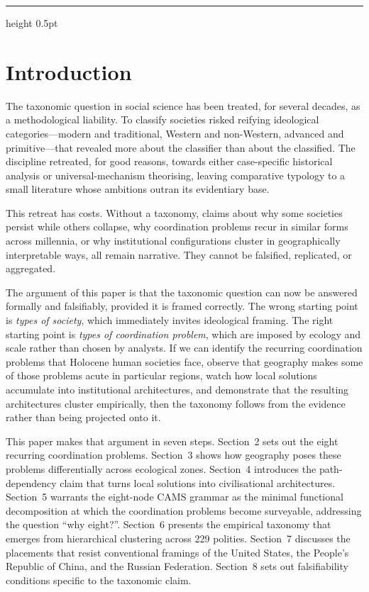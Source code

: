 \documentclass[12pt,a4paper]{article}
\begin{document}
\vspace{1em}
\hrule height 0.5pt
\vspace{0.5em}

\section{Introduction}

The taxonomic question in social science has been treated, for several decades, as a methodological liability. To classify societies risked reifying ideological categories---modern and traditional, Western and non-Western, advanced and primitive---that revealed more about the classifier than about the classified. The discipline retreated, for good reasons, towards either case-specific historical analysis or universal-mechanism theorising, leaving comparative typology to a small literature whose ambitions outran its evidentiary base.

This retreat has costs. Without a taxonomy, claims about why some societies persist while others collapse, why coordination problems recur in similar forms across millennia, or why institutional configurations cluster in geographically interpretable ways, all remain narrative. They cannot be falsified, replicated, or aggregated.

The argument of this paper is that the taxonomic question can now be answered formally and falsifiably, provided it is framed correctly. The wrong starting point is \textit{types of society}, which immediately invites ideological framing. The right starting point is \textit{types of coordination problem}, which are imposed by ecology and scale rather than chosen by analysts. If we can identify the recurring coordination problems that Holocene human societies face, observe that geography makes some of those problems acute in particular regions, watch how local solutions accumulate into institutional architectures, and demonstrate that the resulting architectures cluster empirically, then the taxonomy follows from the evidence rather than being projected onto it.

This paper makes that argument in seven steps. Section~2 sets out the eight recurring coordination problems. Section~3 shows how geography poses these problems differentially across ecological zones. Section~4 introduces the path-dependency claim that turns local solutions into civilisational architectures. Section~5 warrants the eight-node CAMS grammar as the minimal functional decomposition at which the coordination problems become surveyable, addressing the question ``why eight?''. Section~6 presents the empirical taxonomy that emerges from hierarchical clustering across 229 polities. Section~7 discusses the placements that resist conventional framings of the United States, the People's Republic of China, and the Russian Federation. Section~8 sets out falsifiability conditions specific to the taxonomic claim.
\end{document}
